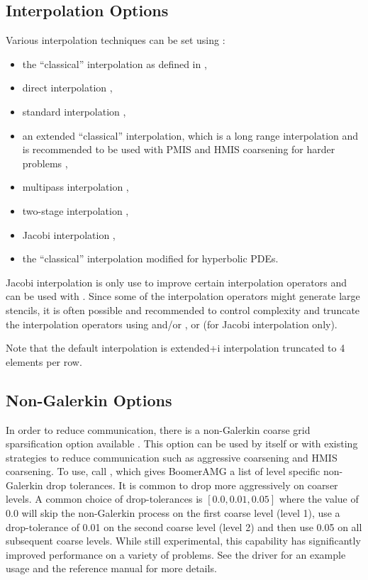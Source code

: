 \subsection{Interpolation Options}
Various interpolation techniques can be set using :
\begin{itemize}
\item the ``classical'' interpolation as defined in \cite{Ruge_Stueben_1987},
\item direct interpolation \cite{Stueben_1999},
\item standard interpolation \cite{Stueben_1999},
\item an extended ``classical'' interpolation, which is a long range interpolation and is recommended to be used with PMIS and HMIS coarsening for harder problems \cite{DeSterck_Falgout_Nolting_Yang_2008},
\item multipass interpolation \cite{Stueben_1999},
\item two-stage interpolation \cite{UMYang_2010},
\item Jacobi interpolation \cite{Stueben_1999},
\item the ``classical'' interpolation modified for hyperbolic PDEs.
\end{itemize}
Jacobi interpolation is only use to improve certain interpolation operators and can be 
used with .
Since some of the interpolation operators might generate large stencils, it is often possible 
and recommended to control complexity and truncate the interpolation operators
using  and/or ,
or  (for Jacobi interpolation only).

Note that the default interpolation is extended+i interpolation \cite{DeSterck_Falgout_Nolting_Yang_2008} truncated to 4 elements per row.

\subsection{Non-Galerkin Options}
In order to reduce communication, there is a non-Galerkin coarse grid
sparsification option available \cite{FaSc2014}.  This option can be used by
itself or with existing strategies to reduce communication such as aggressive
coarsening and HMIS coarsening.  To use, call
, which gives BoomerAMG a list of level
specific non-Galerkin drop tolerances.  It is common to drop more aggressively
on coarser levels.  A common choice of drop-tolerances is $[0.0,
0.01, 0.05]$ where the value of 0.0 will skip the non-Galerkin process on the
first coarse level (level 1), use a drop-tolerance of 0.01 on the second coarse
level (level 2) and then use 0.05 on all subsequent coarse levels.  While still
experimental, this capability has significantly improved performance on a
variety of problems.  See the  driver for an example usage and the
reference manual for more details.


